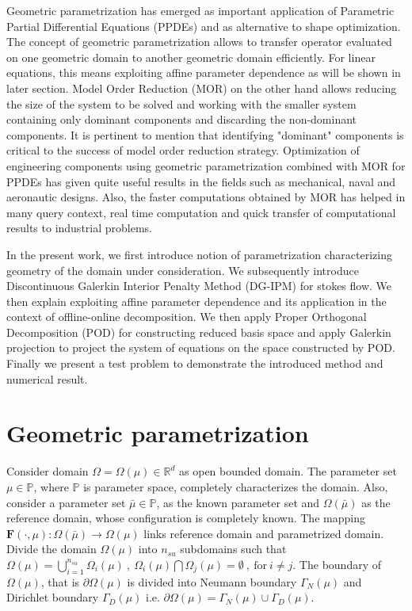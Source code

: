 \documentclass[graybox]{svmult}
\begin{document}
Geometric parametrization has emerged as important application of Parametric Partial Differential Equations (PPDEs) and as alternative to shape optimization. The concept of geometric parametrization allows to transfer operator evaluated on one geometric domain to another geometric domain efficiently. For linear equations, this means exploiting affine parameter dependence as will be shown in later section. Model Order Reduction (MOR) on the other hand allows reducing the size of the system to be solved and working with the smaller system containing only dominant components and discarding the non-dominant components. It is pertinent to mention that identifying "dominant" components is critical to the success of model order reduction strategy. Optimization of engineering components using geometric parametrization combined with MOR for PPDEs has given quite useful results in the fields such as mechanical, naval and aeronautic designs. Also, the  faster computations obtained by MOR has helped in many query context, real time computation and quick transfer of computational results to industrial problems.

In the present work, we first introduce notion of parametrization characterizing geometry of the domain under consideration. We subsequently introduce Discontinuous Galerkin Interior Penalty Method (DG-IPM) for stokes flow. We then explain exploiting affine parameter dependence and its application in the context of offline-online decomposition. We then apply Proper Orthogonal Decomposition (POD) for constructing reduced basis space and apply Galerkin projection to project the system of equations on the space constructed by POD. Finally we present a test problem to demonstrate the introduced method and numerical result.

\section{Geometric parametrization}\label{geometric_parametrization_section}

Consider domain $\Omega = \Omega(\mu) \in \mathbb{R}^d$ as open bounded domain. The parameter set $\mu \in \mathbb{P}$, where $\mathbb{P}$ is parameter space, completely characterizes the domain. Also, consider a parameter set $\bar{\mu} \in \mathbb{P}$, as the known parameter set and $\Omega(\bar{\mu})$ as the reference domain, whose configuration is completely known. The mapping $\bm{F}(\cdot,\mu) : \Omega(\bar{\mu}) \rightarrow \Omega(\mu)$ links reference domain and parametrized domain. Divide the domain $\Omega(\mu)$ into $n_{su}$ subdomains such that $\Omega(\mu) = \bigcup\limits_{i=1}^{n_{su}} \Omega_i(\mu) \ , \ \Omega_i(\mu) \bigcap \Omega_j(\mu) = \emptyset \ , \ \text{for} \ i \neq j$. The boundary of $\Omega(\mu)$, that is $\partial \Omega(\mu)$ is divided into Neumann boundary $\Gamma_N(\mu)$ and Dirichlet boundary $\Gamma_D(\mu)$ i.e. $\partial \Omega(\mu) = \Gamma_N(\mu) \cup \Gamma_D(\mu)$.
\end{document}
